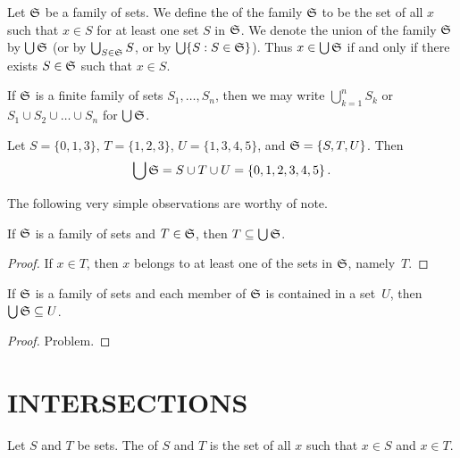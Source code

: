 \begin{defn} Let $\mathfrak{S}$ be a family of sets.  We define the
 of the family $\mathfrak{S}$ to be the set of all $x$ such that $x \in S$ for at
least one set $S$ in $\mathfrak{S}$.  We denote the union of the family $\mathfrak{S}$ by  $\bigcup
\mathfrak{S}$ (or by $\bigcup_{S \in \mathfrak{S}}S$, or by $\bigcup\{S: S \in \mathfrak{S}\}$). Thus $x
\in \bigcup\mathfrak{S}$ if and only if there exists $S \in \mathfrak{S}$ such that $x \in S$.
\end{defn}

\begin{notn} If $\mathfrak{S}$ is a finite family of sets $S_1, \dots,S_n$, then we may write
$\bigcup_{k=1}^n S_k$ or $S_1 \cup S_2 \cup \dots \cup S_n$ for $\bigcup \mathfrak{S}$.
\end{notn}

\begin{exam} Let $S = \{0,1,3\}$, $T = \{1,2,3\}$, $U = \{1,3,4,5\}$, and $\mathfrak{S} = \{S,T,U\}$.  Then
   \[ \bigcup \mathfrak{S} = S \cup T \cup U = \{0,1,2,3,4,5\}\,. \]
\end{exam}

The following very simple observations are worthy of note.

\begin{prop} If $\mathfrak{S}$ is a family of sets and $T \in \mathfrak{S}$, then
$T \subseteq \bigcup \mathfrak{S}$.
\end{prop}

\begin{proof} If $x \in T$, then $x$ belongs to at least one of the sets in $\mathfrak{S}$,
namely~$T$.
\end{proof}

\begin{prop}\label{union_of_fam1} If $\mathfrak{S}$ is a family of sets and each member of
$\mathfrak{S}$ is contained in a set~$U$, then $\bigcup\mathfrak{S} \subseteq U$.
\end{prop}

\begin{proof} Problem. \ns \end{proof}






\section{INTERSECTIONS}
\begin{defn} Let $S$ and $T$ be sets.  The
 of $S$ and $T$ is the set of all $x$ such that $x \in S$ and $x \in T$.
\end{defn}

